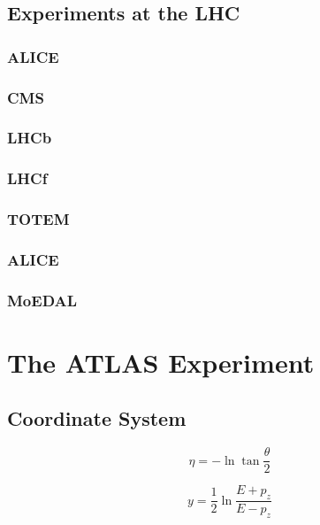 \subsection{Experiments at the LHC}

\subsubsection*{ALICE}

\subsubsection*{CMS}

\subsubsection*{LHCb}

\subsubsection*{LHCf}

\subsubsection*{TOTEM}

\subsubsection*{ALICE}

\subsubsection*{MoEDAL}



\section{The ATLAS Experiment}
\label{sed:cern:atlas}

\subsection{Coordinate System}

\begin{equation}
\label{eq:cern:eta}
\eta = - \ln \tan \frac{\theta}{2}
\end{equation}

\begin{equation}
\label{eq:cern:y}
y = \frac{1}{2} \ln \frac{E + p_z}{E - p_z}
\end{equation}

